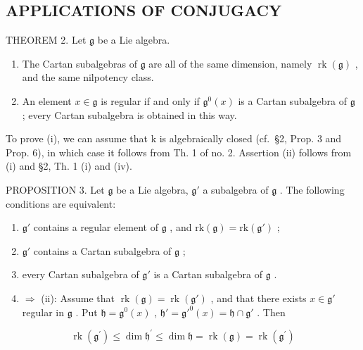 \subsection{APPLICATIONS OF CONJUGACY}

THEOREM 2. Let \(\mathfrak{g}\) be a Lie algebra.

\begin{enumerate}
\def\labelenumi{(\roman{enumi})}
\item
  The Cartan subalgebras of \(\mathfrak{g}\) are all of the same dimension, namely \(\operatorname{rk}(\mathfrak{g})\) , and the same nilpotency class.
\item
  An element \(x \in \mathfrak{g}\) is regular if and only if \(\mathfrak{g}^0(x)\) is a Cartan subalgebra of \(\mathfrak{g}\) ; every Cartan subalgebra is obtained in this way.
\end{enumerate}

To prove (i), we can assume that k is algebraically closed (cf.~§2, Prop. 3 and Prop. 6), in which case it follows from Th. 1 of no. 2. Assertion (ii) follows from (i) and §2, Th. 1 (i) and (iv).

PROPOSITION 3. Let \(\mathfrak{g}\) be a Lie algebra, \(\mathfrak{g}'\) a subalgebra of \(\mathfrak{g}\) . The following conditions are equivalent:

\begin{enumerate}
\def\labelenumi{(\roman{enumi})}
\item
  \(\mathfrak{g}'\) contains a regular element of \(\mathfrak{g}\) , and \(\mathrm{rk}(\mathfrak{g}) = \mathrm{rk}(\mathfrak{g}')\) ;
\item
  \(\mathfrak{g}'\) contains a Cartan subalgebra of \(\mathfrak{g}\) ;
\item
  every Cartan subalgebra of \(\mathfrak{g}'\) is a Cartan subalgebra of \(\mathfrak{g}\) .
\item
  \(\Longrightarrow\) (ii): Assume that \(\operatorname{rk}(\mathfrak{g}) = \operatorname{rk}(\mathfrak{g}')\) , and that there exists \(x \in \mathfrak{g}'\) regular in \(\mathfrak{g}\) . Put \(\mathfrak{h} = \mathfrak{g}^0(x)\) , \(\mathfrak{h}' = \mathfrak{g}'^0(x) = \mathfrak{h} \cap \mathfrak{g}'\) . Then
\end{enumerate}

\[
\operatorname{rk} \left(\mathfrak {g} ^ {\prime}\right) \leq \dim \mathfrak {h} ^ {\prime} \leq \dim \mathfrak {h} = \operatorname{rk} (\mathfrak {g}) = \operatorname{rk} \left(\mathfrak {g} ^ {\prime}\right)
\]

